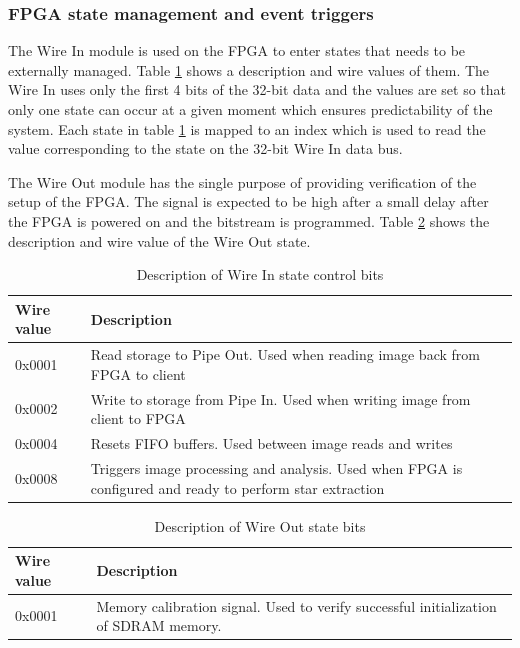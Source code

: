 \documentclass[12pt]{report}
\begin{document}
\subsubsection{FPGA state management and event triggers}
The Wire In module is used on the FPGA to enter states that needs to be externally managed. Table \ref{table:wireInState} shows a description and wire values of them. The Wire In uses only the first 4 bits of the 32-bit data and the values are set so that only one state can occur at a given moment which ensures predictability of the system. Each state in table \ref*{table:wireInState} is mapped to an index which is used to read the value corresponding to the state on the 32-bit Wire In data bus.
\par
The Wire Out module has the single purpose of providing verification of the setup of the FPGA. The signal is expected to be high after a small delay after the FPGA is powered on and the bitstream is programmed. Table \ref*{table:wireOutState} shows the description and wire value of the Wire Out state.

\begin{table}[h]
    \begin{tabular}{|p{3cm}|p{10cm}|}
        \hline
        \textbf{Wire value}&\textbf{Description}\\
        \hline
        0x0001&Read storage to Pipe Out. Used when reading image back from FPGA to client\\
        \hline
        0x0002&Write to storage from Pipe In. Used when writing image from client to FPGA\\ 
        \hline
        0x0004&Resets FIFO buffers. Used between image reads and writes \\
        \hline
        0x0008&Triggers image processing and analysis. Used when FPGA is configured and ready to perform star extraction\\
        \hline
    \end{tabular}
    \caption{Description of Wire In state control bits}
    \label{table:wireInState}
\end{table}
\begin{table}[h]
    \begin{tabular}{|p{3cm}|p{10cm}|}
        \hline
        \textbf{Wire value}&\textbf{Description}\\
        \hline
        0x0001&Memory calibration signal. Used to verify successful initialization of SDRAM memory.\\
        \hline
    \end{tabular}
    \caption{Description of Wire Out state bits}
    \label{table:wireOutState}
\end{table}
\end{document}
